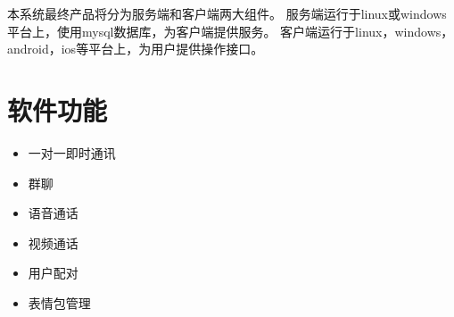 



%
%    
%

本系统最终产品将分为服务端和客户端两大组件。
服务端运行于linux或windows平台上，使用mysql数据库，为客户端提供服务。
客户端运行于linux，windows，android，ios等平台上，为用户提供操作接口。

\section{软件功能}
%
%
%
%
\begin{itemize}
\item 一对一即时通讯
\item 群聊
\item 语音通话
\item 视频通话
\item 用户配对
\item 表情包管理
\end{itemize}

